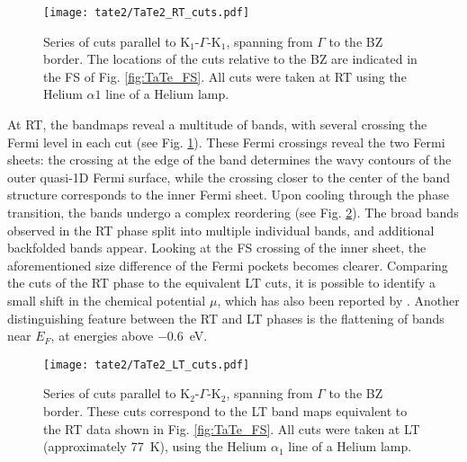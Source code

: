 \begin{figure}[t!]
	\centering
	\texttt{[image: tate2/TaTe2\_RT\_cuts.pdf]}
	\caption{Series of cuts parallel to K$_1$-$\Gamma$-K$_1$, spanning from $\Gamma$ to the BZ border. The locations of the cuts relative to the BZ are indicated in the FS of Fig. \ref{fig:TaTe_FS}. All cuts were taken at RT using the Helium $\alpha1$ line of a Helium lamp.}
	\label{fig:TaTe_RT_cuts}
\end{figure}

At RT, the bandmaps reveal a multitude of bands, with several crossing the Fermi level in each cut (see Fig. \ref{fig:TaTe_RT_cuts}).
These Fermi crossings reveal the two Fermi sheets: the crossing at the edge of the band determines the wavy contours of the outer quasi-1D Fermi surface, while the crossing closer to the center of the band structure corresponds to the inner Fermi sheet.
Upon cooling through the phase transition, the bands undergo a complex reordering (see Fig. \ref{fig:TaTe_LT_cuts}).
The broad bands observed in the RT phase split into multiple individual bands, and additional backfolded bands appear.
Looking at the FS crossing of the inner sheet, the aforementioned size difference of the Fermi pockets becomes clearer.
Comparing the cuts of the RT phase to the equivalent LT cuts, it is possible to identify a small shift in the chemical potential $\mu$, which has also been reported by \cite{mitsuishi_unveiling_2024}.
Another distinguishing feature between the RT and LT phases is the flattening of bands near $E_F$, at energies above \qty{-0.6}{\electronvolt}.

\begin{figure}[h]
	\centering
	\texttt{[image: tate2/TaTe2\_LT\_cuts.pdf]}
	\caption{Series of cuts parallel to K$_2$-$\Gamma$-K$_2$, spanning from $\Gamma$ to the BZ border. These cuts correspond to the LT band maps equivalent to the RT data shown in Fig. \ref{fig:TaTe_FS}. All cuts were taken at LT (approximately \qty{77}{\kelvin}), using the Helium $\alpha_1$ line of a Helium lamp.}
	\label{fig:TaTe_LT_cuts}
\end{figure}

